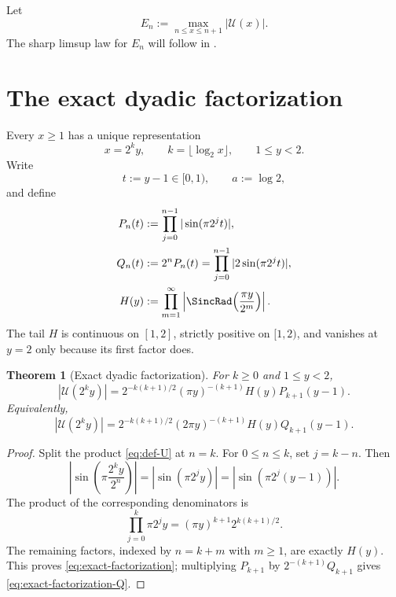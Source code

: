 \documentclass[11pt,oneside]{article}
\newtheorem{theorem}{Theorem}[section]
\theoremstyle{definition}
\theoremstyle{remark}
\newcommand{\Uhat}{\mathcal U}
\begin{document}
Let
\begin{equation}\label{eq:En}
 E_n:=\max_{n\le x\le n+1}|\Uhat(x)|.
\end{equation}
The sharp limsup law for $E_n$ will follow in .

\section{The exact dyadic factorization}\label{sec:dyadic}

Every $x\ge1$ has a unique representation
\begin{equation}\label{eq:mantissa}
 x=2^k y,\qquad k=\lfloor\log_2x\rfloor,\qquad 1\le y<2.
\end{equation}
Write
\[
 t:=y-1\in[0,1),\qquad a:=\log2,
\]
and define
\begin{align}
 P_n(t)&:=\prod_{j=0}^{n-1}|\sin(\pi2^jt)|,\label{eq:Pn}\\
 Q_n(t)&:=2^nP_n(t)
       =\prod_{j=0}^{n-1}|2\sin(\pi2^jt)|,\label{eq:Qn}\\
 H(y)&:=\prod_{m=1}^{\infty}
 \left|\SincRad\!\left(\frac{\pi y}{2^m}\right)\right|.
 \label{eq:H}
\end{align}
The tail $H$ is continuous on $[1,2]$, strictly positive on $[1,2)$, and vanishes at
$y=2$ only because its first factor does.

\begin{theorem}[Exact dyadic factorization]\label{thm:factorization}
For $k\ge0$ and $1\le y<2$,
\begin{equation}\label{eq:exact-factorization}
 |\Uhat(2^ky)|
 =2^{-k(k+1)/2}(\pi y)^{-(k+1)}H(y)P_{k+1}(y-1).
\end{equation}
Equivalently,
\begin{equation}\label{eq:exact-factorization-Q}
 |\Uhat(2^ky)|
 =2^{-k(k+1)/2}(2\pi y)^{-(k+1)}H(y)Q_{k+1}(y-1).
\end{equation}
\end{theorem}

\begin{proof}
Split the product \eqref{eq:def-U} at $n=k$.  For $0\le n\le k$, set $j=k-n$.
Then
\[
 \left|\sin\!\left(\pi\frac{2^ky}{2^n}\right)\right|
 =|\sin(\pi2^jy)|
 =|\sin(\pi2^j(y-1))|.
\]
The product of the corresponding denominators is
\[
 \prod_{j=0}^{k}\pi2^jy
 =(\pi y)^{k+1}2^{k(k+1)/2}.
\]
The remaining factors, indexed by $n=k+m$ with $m\ge1$, are exactly $H(y)$.
This proves \eqref{eq:exact-factorization}; multiplying $P_{k+1}$ by
$2^{-(k+1)}Q_{k+1}$ gives \eqref{eq:exact-factorization-Q}.
\end{proof}
\end{document}
